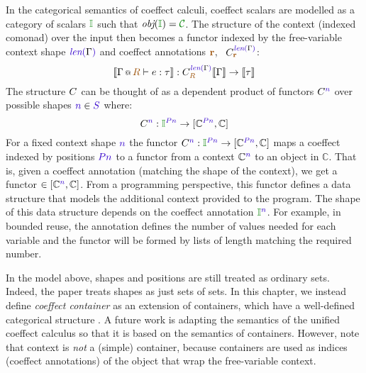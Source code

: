 \noindent
In the categorical semantics of coeffect calculi, coeffect scalars are modelled as a
category of scalars $\cclrd{\mathbb{I}}$ such that $\textit{obj}(\cclrd{\mathbb{I}}) = \C$.
The structure of the context (indexed comonad) over the input then becomes a functor
indexed by the free-variable context shape $\slen{\Gamma}$ and coeffect annotations
$\aclrd{\textbf{r}}$, \ie~$\ctyp{\slen{\Gamma}}_{\aclrd{\textbf{r}}}$:
%
\begin{equation*}
\sem{\coctx{\Gamma}{\aclrd{R}} \vdash e : \tau} : \ctyp{\slen{\Gamma}}_{\aclrd{R}}
\sem{\Gamma} \rightarrow \sem{\tau}
\end{equation*}
%
The structure $\ctyp{}$ can be thought of as a dependent product of functors $\ctyp{\sclrd{n}}$ 
over possible shapes $\sclrd{n} \in \SH$ where:
%
\begin{equation*}
\ctyp{\sclrd{n}} : \cclrd{\mathbb{I}}^{\SP \sclrd{n}} \rightarrow [\mathbb{C}^{\SP \sclrd{n}}, \mathbb{C}]
\end{equation*}
%
For a fixed context shape $\sclrd{n}$ the functor 
$\ctyp{\sclrd{n}} : \cclrd{\mathbb{I}}^{\SP \sclrd{n}} \rightarrow [\mathbb{C}^{\SP \sclrd{n}}, \mathbb{C}]$ 
maps a coeffect indexed by positions $\SP \sclrd{n}$ to a functor from a context 
$\mathbb{C}^{\sclrd{n}}$ to an object in $\mathbb{C}$. That is, given a coeffect annotation 
(matching the shape of the context), we get a functor $\in [\mathbb{C}^{\sclrd{n}},\mathbb{C}]$. 
From a programming perspective, this functor defines a data structure that models the additional
context provided to the program. The shape of this data structure depends on the coeffect
annotation $\cclrd{\mathbb{I}}^{\sclrd{n}}$. For example, in bounded reuse, the annotation defines
the number of values needed for each variable and the functor will be 
formed by lists of length matching the required number. 

In the model above, shapes and positions are still treated as ordinary sets. Indeed, the paper
\cite{coeffects-icfp14} treats shapes as just sets of sets. In this chapter, we instead define
\emph{coeffect container} as an extension of containers, which have a well-defined 
categorical structure \cite{semantics-containers}. A future work is adapting the semantics of
the unified coeffect calculus so that it is based on the semantics of containers. However, note 
that context is \emph{not} a (simple) container, because containers are used as indices (coeffect
annotations) of the object that wrap the free-variable context.



